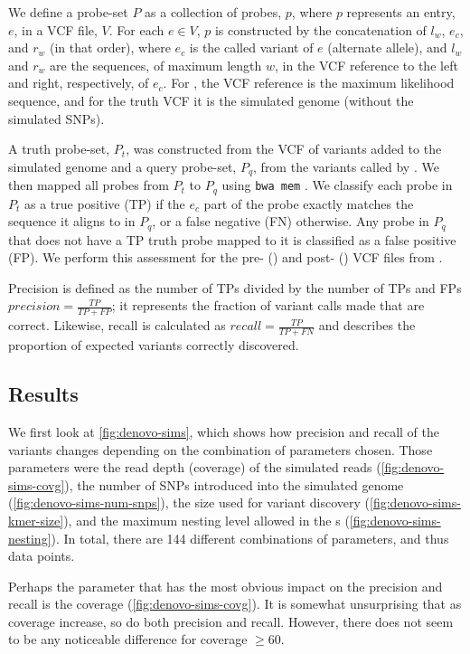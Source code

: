 We define a probe-set $P$ as a collection of probes, $p$, where $p$ represents an entry, $e$, in a VCF file, $V$. For each $e \in V$, $p$ is constructed by the concatenation of $l_w$, $e_c$, and $r_w$ (in that order), where $e_c$ is the called variant of $e$ (alternate allele), and $l_w$ and $r_w$ are the sequences, of maximum length $w$, in the VCF reference to the left and right, respectively, of $e_c$. For \pandora{}, the VCF reference is the maximum likelihood sequence, and for the truth VCF it is the simulated genome (without the simulated SNPs).

A truth probe-set, $P_t$, was constructed from the VCF of variants added to the simulated genome and a query probe-set, $P_q$, from the variants called by \pandora{}. We then mapped all probes from $P_t$ to $P_q$ using \texttt{bwa mem} \cite{li2013}. We classify each probe in $P_t$ as a true positive (TP) if the $e_c$ part of the probe exactly matches the sequence it aligns to in $P_q$, or a false negative (FN) otherwise. Any probe in $P_q$ that does not have a TP truth probe mapped to it is classified as a false positive (FP). We perform this assessment for the pre-\denovo{} () and post-\denovo{} () VCF files from \pandora{}. 

Precision is defined as the number of TPs divided by the number of TPs and FPs $precision=\frac{TP}{TP+FP}$; it represents the fraction of variant calls made that are correct. Likewise, recall is calculated as $recall=\frac{TP}{TP+FN}$ and describes the proportion of expected variants correctly discovered.

\subsection{Results}
\label{sec:denovo-sims-results}

We first look at \autoref{fig:denovo-sims}, which shows how precision and recall of the \pandora{} \denovo{} variants changes depending on the combination of parameters chosen. Those parameters were the read depth (coverage) of the simulated reads (\autoref{fig:denovo-sims-covg}), the number of SNPs introduced into the simulated genome (\autoref{fig:denovo-sims-num-snps}), the \kmer{} size used for variant discovery (\autoref{fig:denovo-sims-kmer-size}), and the maximum nesting level allowed in the \prg{}s (\autoref{fig:denovo-sims-nesting}). In total, there are 144 different combinations of parameters, and thus data points.

Perhaps the parameter that has the most obvious impact on the precision and recall is the coverage (\autoref{fig:denovo-sims-covg}). It is somewhat unsurprising that as coverage increase, so do both precision and recall. However, there does not seem to be any noticeable difference for coverage $\ge 60$.

